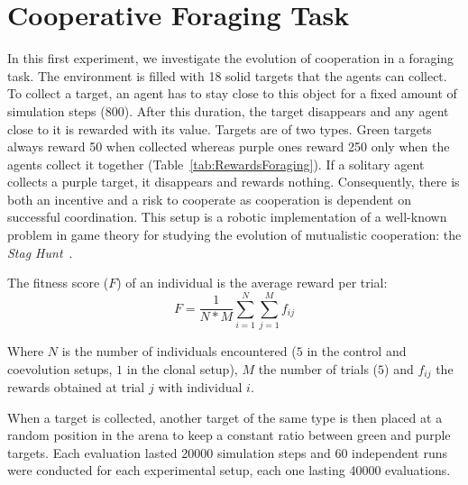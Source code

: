 \section{Cooperative Foraging Task}
  
  In this first experiment, we investigate the evolution of cooperation in a foraging task. The environment is filled with 18 solid targets that the agents can collect. To collect a target, an agent has to stay close to this object for a fixed amount of simulation steps (800). After this duration, the target disappears and any agent close to it is rewarded with its value. Targets are of two types. Green targets always reward 50 when collected whereas purple ones reward 250 only when the agents collect it together (Table~\ref{tab:RewardsForaging}). If a solitary agent collects a purple target, it disappears and rewards nothing. Consequently, there is both an incentive and a risk to cooperate as cooperation is dependent on successful coordination. This setup is a robotic implementation of a well-known problem in game theory for studying the evolution of mutualistic cooperation: the {\em Stag Hunt}~\parencite{Skyrms2004}.

  The fitness score (\(F\)) of an individual is the average reward per trial:
 \[
  F = \frac{1}{N*M} \sum_{i=1}^{N} \sum_{j=1}^{M} f_{ij}
  \]
  
  Where \(N\) is the number of individuals encountered ($5$ in the control and coevolution setups, $1$ in the clonal setup), \(M\) the number of trials ($5$) and \(f_{ij}\) the rewards obtained at trial \(j\) with individual \(i\).

  When a target is collected, another target of the same type is then placed at a random position in the arena to keep a constant ratio between green and purple targets. Each evaluation lasted 20000 simulation steps and 60 independent runs were conducted for each experimental setup, each one lasting 40000 evaluations.

  \begin{table}[h]
    \caption{\textbf{Rewards for the foraging of the different targets.}
    Rewards depend on whether they were collected alone or cooperatively.}
    \label{tab:RewardsForaging}
  \end{table}

